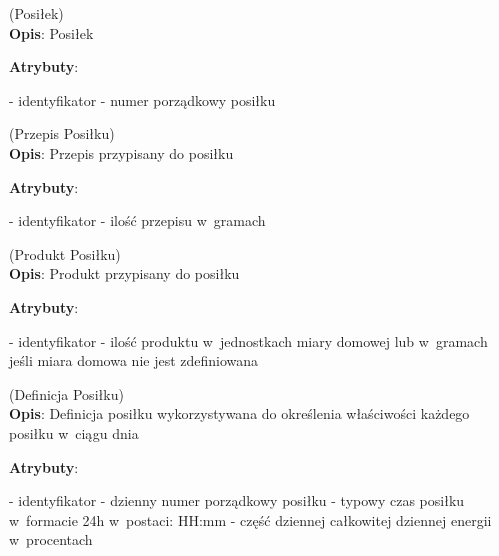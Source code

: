 \begin{enumerate}[label={\textbf{KAT/4/\protect\twodigits{\theenumi}}}, wide, labelwidth=!, labelindent=0pt, labelsep=0pt, series=reqs]
    \label{kat:Meal} (Posiłek)\\
    \indent\textbf{Opis}: Posiłek
    \par
    \textbf{Atrybuty}:
    \begin{itemize}[series=atr, wide, align=left, leftmargin=190pt]
        \label{kat:Meal:id}- identyfikator
        \label{kat:Meal:ordinalNumber}- numer porządkowy posiłku
    \end{itemize}

    \label{kat:MealRecipe} (Przepis Posiłku)\\
    \indent\textbf{Opis}: Przepis przypisany do posiłku
    \par
    \textbf{Atrybuty}:
    \begin{itemize}[series=atr, wide, align=left, leftmargin=190pt]
        \label{kat:MealRecipe:id}- identyfikator
        \label{kat:MealRecipe:amount}- ilość przepisu w~gramach
    \end{itemize}

    \label{kat:MealProduct} (Produkt Posiłku)\\
    \indent\textbf{Opis}: Produkt przypisany do posiłku
    \par
    \textbf{Atrybuty}:
    \begin{itemize}[series=atr, wide, align=left, leftmargin=190pt]
        \label{kat:MealProduct:id}- identyfikator
        \label{kat:MealProduct:amount}- ilość produktu w~jednostkach miary domowej lub w~gramach jeśli miara domowa nie jest zdefiniowana
    \end{itemize}

    \label{kat:MealDefinition} (Definicja Posiłku)\\
    \indent\textbf{Opis}: Definicja posiłku wykorzystywana do określenia właściwości każdego posiłku w~ciągu dnia
    \par
    \textbf{Atrybuty}:
    \begin{itemize}[series=atr, wide, align=left, leftmargin=190pt]
        \label{kat:MealDefinition:id}- identyfikator
        \label{kat:MealDefinition:ordinalNumber}- dzienny numer porządkowy posiłku
        \label{kat:MealDefinition:timeOfMeal}- typowy czas posiłku w~formacie 24h w~postaci: HH:mm
        \label{kat:MealDefinition:percentOfEnergy}- część dziennej całkowitej dziennej energii w~procentach
    \end{itemize}

\end{enumerate}

